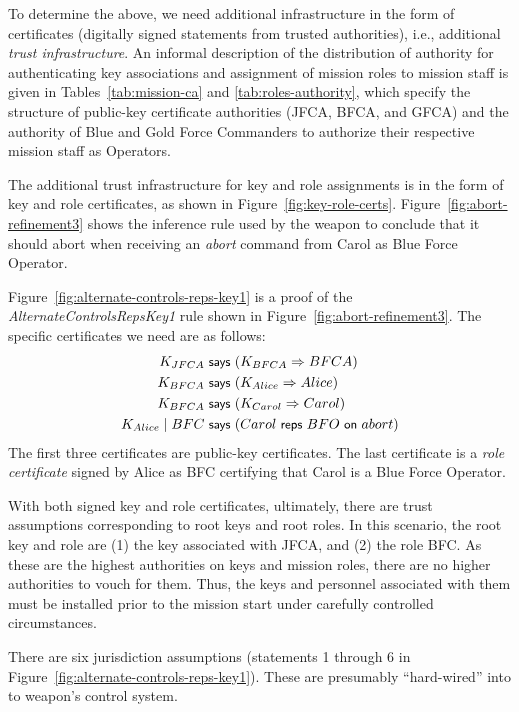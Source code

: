 To determine the above, we need additional infrastructure in the form
of certificates (digitally signed statements from trusted
authorities), i.e., additional \emph{trust infrastructure}. An
informal description of the distribution of authority for
authenticating key associations and assignment of mission roles to
mission staff is given in Tables~\ref{tab:mission-ca} and
\ref{tab:roles-authority}, which specify the structure of public-key
certificate authorities (JFCA, BFCA, and GFCA) and the authority of
Blue and Gold Force Commanders to authorize their respective mission
staff as Operators.

The additional trust infrastructure for key and role assignments is in
the form of key and role certificates, as shown in
Figure~\ref{fig:key-role-certs}. Figure~\ref{fig:abort-refinement3}
shows the inference rule used by the weapon to conclude that it should
abort when receiving an \emph{abort} command from Carol as Blue Force
Operator.

Figure~\ref{fig:alternate-controls-reps-key1} is a proof of the
\emph{AlternateControlsRepsKey1} rule shown in
Figure~\ref{fig:abort-refinement3}. The specific certificates we need
are as follows:
\begin{align*}
  K_{JFCA} & \text{\small\textsf{ says }} (K_{BFCA} \Rightarrow BFCA)\\
  K_{BFCA} & \text{\small\textsf{ says }} (K_{Alice} \Rightarrow Alice)\\
  K_{BFCA} & \text{\small\textsf{ says }} (K_{Carol} \Rightarrow Carol)\\
  K_{Alice} \;|\; BFC & \text{\small\textsf{ says }} ({Carol} \text{\small\textsf{ reps }}{BFO}{\text{\small\textsf{ on }}}{abort})\\
\end{align*}
The first three certificates are public-key certificates. The last
certificate is a \emph{role certificate} signed by Alice as BFC
certifying that Carol is a Blue Force Operator.

With both signed key and role certificates, ultimately, there are
trust assumptions corresponding to root keys and root roles. In this
scenario, the root key and role are (1) the key associated with JFCA,
and (2) the role BFC. As these are the highest authorities on keys and
mission roles, there are no higher authorities to vouch for
them. Thus, the keys and personnel associated with them must be
installed prior to the mission start under carefully controlled
circumstances.

There are six jurisdiction assumptions (statements 1 through 6 in
Figure~\ref{fig:alternate-controls-reps-key1}). These are presumably
``hard-wired'' into to weapon's control system.

